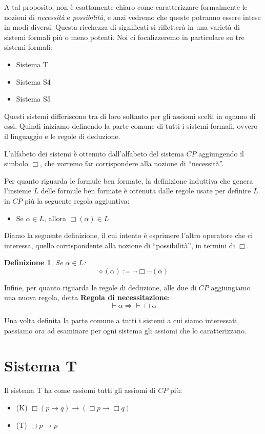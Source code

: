 \documentclass[a4paper, titlepage, 12pt]{report}
\newtheorem{definition}{Definizione}[chapter]
\begin{document}
A tal proposito, non è esattamente chiaro come caratterizzare formalmente
le nozioni di \emph{necessità} e \emph{possibilità},
e anzi vedremo che queste potranno essere intese in modi diversi.
Questa ricchezza di significati si rifletterà in una varietà di sistemi formali più o meno potenti.
Noi ci focalizzeremo in particolare su tre sistemi formali:
\begin{itemize}
\item Sistema T
\item Sistema S4
\item Sistema S5
\end{itemize}

Questi sistemi differiscono tra di loro soltanto per gli assiomi scelti in ognuno di essi.
Quindi iniziamo definendo la parte comune di tutti i sistemi formali, ovvero il linguaggio
e le regole di deduzione.

L'alfabeto dei sistemi è ottenuto dall'alfabeto del sistema $CP$ aggiungendo il simbolo $\Box$,
che vorremo far corrispondere alla nozione di ``necessità''.

Per quanto riguarda le formule ben formate, la definizione induttiva che genera l'insieme $L$
delle formule ben formate è ottenuta dalle regole usate per definire $L$ in $CP$ più
la seguente regola aggiuntiva:
\begin{itemize}
\item Se $\alpha \in L$, allora $\Box (\alpha) \in L$
\end{itemize}

Diamo la seguente definizione, il cui intento è esprimere l'altro operatore
che ci interessa, quello corrispondente alla nozione di ``possibilità'', in termini di $\Box$.

\begin{definition}
Se $\alpha \in L$:
$$\diamond (\alpha) := \neg \Box \neg (\alpha)$$
\end{definition}

Infine, per quanto riguarda le regole di deduzione, alle due di $CP$ aggiungiamo
una nuova regola, detta \textbf{Regola di necessitazione}:
$$\vdash \alpha \Rightarrow \vdash \Box \alpha$$

Una volta definita la parte comune a tutti i sistemi a cui siamo interessati,
passiamo ora ad esaminare per ogni sistema gli assiomi che lo caratterizzano.

\section{Sistema T}
Il sistema T ha come assiomi tutti gli assiomi di $CP$ più:
\begin{itemize}
\item (K) $\Box (p \rightarrow q) \rightarrow (\Box p \rightarrow \Box q)$
\item (T) $\Box p \rightarrow p$
\end{itemize}
\end{document}
